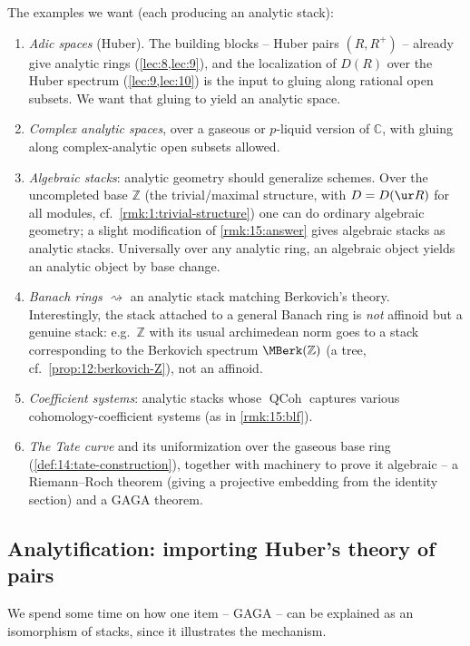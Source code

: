 \begin{remark}[Desiderata]
\label{rmk:15:desiderata}
The examples we want (each producing an analytic stack):
\begin{enumerate}
\item \emph{Adic spaces} (Huber). The building blocks -- Huber pairs $(R,R^+)$ --
already give analytic rings (\cref{lec:8,lec:9}), and the localization of
$D(R)$ over the Huber spectrum (\cref{lec:9,lec:10}) is the input to gluing along
rational open subsets. We want that gluing to yield an analytic space.
\item \emph{Complex analytic spaces}, over a gaseous or $p$-liquid version of
$\mathbb{C}$, with gluing along complex-analytic open subsets allowed.
\item \emph{Algebraic stacks}: analytic geometry should generalize schemes. Over the
uncompleted base $\mathbb{Z}$ (the trivial/maximal structure, with $D = D(\ur R)$ for
all modules, cf.\ \cref{rmk:1:trivial-structure}) one can do ordinary algebraic
geometry; a slight modification of \cref{rmk:15:answer} gives algebraic stacks as
analytic stacks. Universally over any analytic ring, an algebraic object yields an
analytic object by base change.
\item \emph{Banach rings} $\rightsquigarrow$ an analytic stack matching Berkovich's
theory. Interestingly, the stack attached to a general Banach ring is \emph{not}
affinoid but a genuine stack: e.g.\ $\mathbb{Z}$ with its usual archimedean norm goes
to a stack corresponding to the Berkovich spectrum $\MBerk(\mathbb{Z})$ (a tree,
cf.\ \cref{prop:12:berkovich-Z}), not an affinoid.
\item \emph{Coefficient systems}: analytic stacks whose $\operatorname{QCoh}$
captures various cohomology-coefficient systems (as in \cref{rmk:15:blf}).
\item \emph{The Tate curve} and its uniformization over the gaseous base ring
(\cref{def:14:tate-construction}), together with machinery to prove it algebraic --
a Riemann--Roch theorem (giving a projective embedding from the identity section)
and a GAGA theorem.
\end{enumerate}
\end{remark}

\subsection{Analytification: importing Huber's theory of pairs}

We spend some time on how one item -- GAGA -- can be explained as an isomorphism
of stacks, since it illustrates the mechanism.

